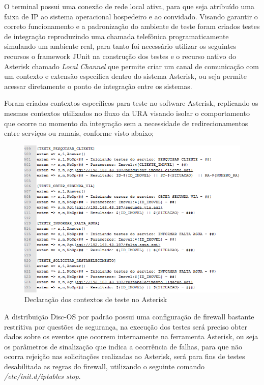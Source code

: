O terminal possui uma conexão de rede local ativa, para que seja atribuído uma faixa de IP ao sistema operacional hospedeiro e ao convidado.
Visando garantir o correto funcionamento e a padronização do ambiente de teste foram criados testes de integração reproduzindo uma chamada telefônica programaticamente simulando um ambiente real, para tanto foi necessário utilizar os seguintes recursos o framework JUnit na construção dos testes e o recurso nativo do Asterisk chamado \textit{Local Channel} que permite criar um canal de comunicação com um contexto e extensão específica dentro do sistema Asterisk, ou seja permite acessar diretamente o ponto de integração entre os sistemas.

Foram criados contextos específicos para teste no software Asterisk, replicando os mesmos contextos utilizados no fluxo da URA visando 
isolar o comportamento que ocorre no momento da integração sem a necessidade de redirecionamentos entre serviços ou ramais, conforme visto abaixo;

\begin{figure}[H]
	\centering
	\caption{Declaração dos contextos de teste no Asterisk}
	\label{figura:contextoTeste}
	\includegraphics{figuras/contexto_teste.png}
\end{figure}

A distribuição Disc-OS por padrão possui uma configuração de firewall bastante restritiva por questões de segurança, na execução dos testes será preciso obter dados sobre os eventos que ocorrem internamente na ferramenta Asterisk, ou seja os parâmetros de sinalização que indica a ocorrência de falhas, para que não ocorra rejeição nas solicitações realizadas ao Asterisk, será para fins de testes desabilitada as regras do firewall, utilizando o seguinte comando \textit{/etc/init.d/iptables stop}.

